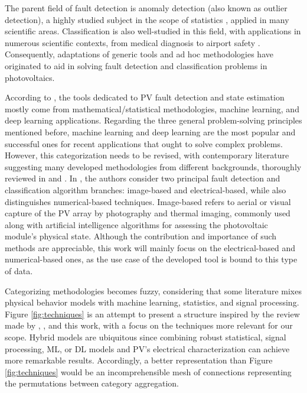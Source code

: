 The parent field of fault detection is anomaly detection (also known as outlier detection), a highly studied subject in the scope of statistics \cite{Prasad2009}, applied in many scientific areas. Classification is also well-studied in this field, with applications in numerous scientific contexts, from medical diagnosis to airport safety \cite{classification}. Consequently, adaptations of generic tools and ad hoc methodologies have originated to aid in solving fault detection and classification problems in photovoltaics.

According to \cite{AIPV}, the tools dedicated to PV fault detection and state estimation mostly come from mathematical/statistical methodologies, machine learning, and deep learning applications. Regarding the three general problem-solving principles mentioned before, machine learning and deep learning are the most popular and successful ones for recent applications that ought to solve complex problems. However, this categorization needs to be revised, with contemporary literature suggesting many developed methodologies from different backgrounds, thoroughly reviewed in \cite{Hong2022} and \cite{Livera2019}. In \cite{Hong2022}, the authors consider two principal fault detection and classification algorithm branches: image-based and electrical-based, while \cite{Livera2019} also distinguishes numerical-based techniques. Image-based refers to aerial or visual capture of the PV array by photography and thermal imaging, commonly used along with artificial intelligence algorithms for assessing the photovoltaic module's physical state. Although the contribution and importance of such methods are appreciable, this work will mainly focus on the electrical-based and numerical-based ones, as the use case of the developed tool is bound to this type of data.

Categorizing methodologies becomes fuzzy, considering that some literature mixes physical behavior models with machine learning, statistics, and signal processing. Figure \ref{fig:techniques} is an attempt to present a structure inspired by the review made by \cite{Hong2022}, \cite{Livera2019}, and this work, with a focus on the techniques more relevant for our scope. Hybrid models are ubiquitous since combining robust statistical, signal processing, ML, or DL models and PV's electrical characterization can achieve more remarkable results. Accordingly, a better representation than Figure \ref{fig:techniques} would be an incomprehensible mesh of connections representing the permutations between category aggregation.
 
